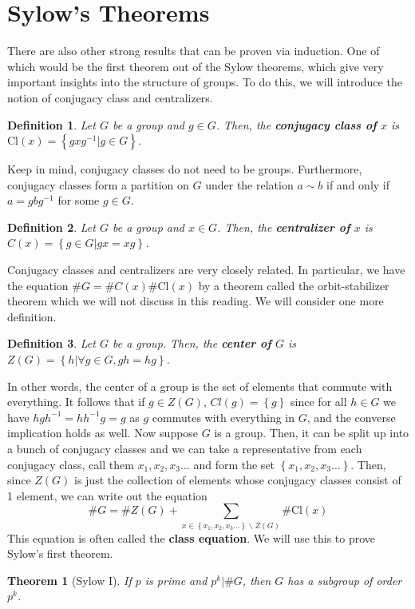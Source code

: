\documentclass[letterpaper,12pt]{article}
\newcommand{\set}[1]{\left\{ #1 \right\}}
\newtheorem{theorem}{Theorem}[section]
\newtheorem{definition}{Definition}[section]
\begin{document}
\section{Sylow's Theorems} 
    There are also other strong results that can be proven via induction. One of which would be the first theorem out of the Sylow theorems, which give very important insights into the structure of groups. To do this, we will introduce the notion of conjugacy class and centralizers.
    \begin{definition}
        Let $G$ be a group and $g \in G$. Then, the \textbf{conjugacy class of} $x$ is $\mathrm{Cl}(x) = \set{gxg^{-1}|g \in G}$.
    \end{definition}
    Keep in mind, conjugacy classes do not need to be groups. Furthermore, conjugacy classes form a partition on $G$ under the relation $a \sim b$ if and only if $a = gbg^{-1}$ for some $g \in G$.
    \begin{definition}
        Let $G$ be a group and $x \in G$. Then, the \textbf{centralizer of} $x$ is $C(x)=\set{g \in G | gx = xg}$.
    \end{definition}
    Conjugacy classes and centralizers are very closely related. In particular, we have the equation $\# G = \#C(x)\#\mathrm{Cl}(x)$ by a theorem called the orbit-stabilizer theorem which we will not discuss in this reading. We will consider one more definition.
    \begin{definition}
        Let $G$ be a group. Then, the \textbf{center of} $G$ is $Z(G) = \set{h | \forall g \in G, gh = hg}$.
    \end{definition}
    In other words, the center of a group is the set of elements that commute with everything. It follows that if $g \in Z(G)$, $Cl(g) = \set{g}$ since for all $h \in G$ we have $hgh^{-1} = hh^{-1}g = g$ as $g$ commutes with everything in $G$, and the converse implication holds as well. Now suppose $G$ is a group. Then, it can be split up into a bunch of conjugacy classes and we can take a representative from each conjugacy class, call them $x_1,x_2,x_3\ldots$ and form the set $\set{x_1,x_2,x_3\ldots}$. Then, since $Z(G)$ is just the collection of elements whose conjugacy classes consist of 1 element, we can write out the equation
    $$\# G = \#Z(G) + \sum_{x \in \set{x_1,x_2,x_3\ldots}\backslash Z(G)} \# \mathrm{Cl}(x)$$
    This equation is often called the \textbf{class equation}. We will use this to prove Sylow's first theorem.
    \begin{theorem}[Sylow I]
        If $p$ is prime and $p^k | \#G$, then $G$ has a subgroup of order $p^k$.
    \end{theorem}
\end{document}
